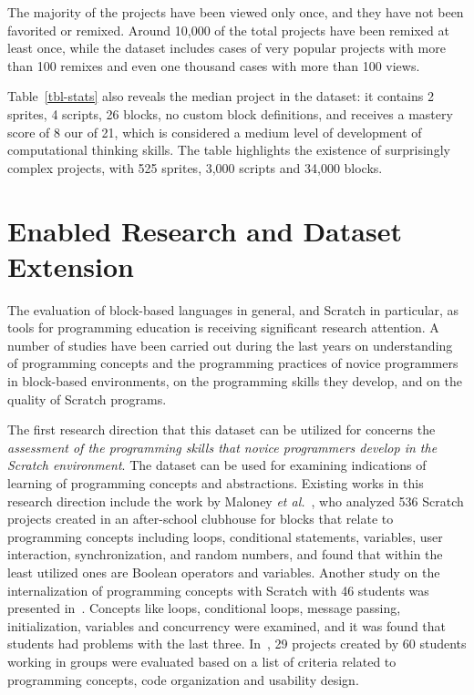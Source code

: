 \documentclass[10pt, conference]{IEEEtran}
\newcommand{\fenia}[1]{\emph{\color{blue}Fenia says: #1}}
\begin{document}
The majority of the projects have been viewed only once, and they have not been favorited or remixed.
Around 10,000 of the total projects have been remixed at least once, while the dataset includes cases of very popular projects with more than 100 remixes and even one thousand cases with more than 100 views. 

Table~\ref{tbl-stats} also reveals the median project in the dataset: it contains 2 sprites, 4 scripts, 26 blocks, no custom block definitions, and receives a mastery score of 8 our of 21, which is considered a medium level of development of computational thinking skills. The table highlights the existence of surprisingly complex projects, with 525 sprites, 3,000 scripts and 34,000 blocks.

\section{Enabled Research and Dataset Extension}


The evaluation of block-based languages in general, and Scratch in particular, as tools for programming education is receiving significant research attention.
A number of studies have been carried out during the last years on understanding of programming concepts and the programming practices of novice programmers in block-based environments, on the programming skills they develop, and on the quality of Scratch programs.

The first research direction that this dataset can be utilized for concerns the \textit{assessment of the programming skills that novice programmers develop in the Scratch environment}.
The dataset can be used for examining indications of learning of programming concepts and abstractions.
Existing works in this research direction include the work by Maloney \emph{et al.}~\cite{Maloney_2008}, who analyzed 536 Scratch projects created in an after-school clubhouse for blocks that relate to programming concepts including loops, conditional statements, variables, user interaction, synchronization, and random numbers, and found that within the least utilized ones are Boolean operators and variables.
Another study on the internalization of programming concepts with Scratch with 46 students was presented in~\cite{meerbaum-salant_learning_2010}.
Concepts like loops, conditional loops, message passing, initialization, variables and concurrency were examined, and it was found that students had problems with the last three. In~\cite{wilson_evaluation_2012}, 29 projects created by 60 students working in groups were evaluated based on a list of criteria related to programming concepts, code organization and usability design.
\end{document}
